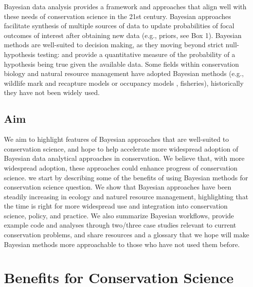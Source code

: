 \documentclass{article}
\begin{document}
\par Bayesian data analysis provides a framework and approaches that align well with these needs of conservation science in the 21st century. Bayesian approaches facilitate synthesis of multiple sources of data to update probabilities of focal outcomes of interest after obtaining new data (e.g., priors, see Box 1). Bayesian methods are well-suited to decision making, as they moving beyond strict null-hypothesis testing:
and provide a quantitative measure of the probability of a hypothesis being true given the available data. %
Some fields within conservation biology and natural resource management have adopted Bayesian methods (e.g., wildlife mark and recapture models or occupancy models \citep{}, fisheries\citep{}), historically they have not been widely used.

\subsection*{Aim} We aim to highlight features of Bayesian approaches that are well-suited to conservation science, and hope to help accelerate more widespread adoption of Bayesian data analytical approaches in conservation. We believe that, with more widespread adoption, these approaches could enhance progress of conservation science. we start by describing some of the benefits of using Bayesian methods for conservation science question. We show that Bayesian approaches have been steadily increasing in ecology and naturel resource management, highlighting that the time is right for more widespread use and integration into conservation science, policy, and practice. We also summarize Bayesian workflows, provide example code and analyses through two/three case studies relevant to current conservation problems, and share resources and a glossary that we hope will make Bayesian methods more approachable to those who have not used them before.
\section* {Benefits for Conservation Science}
\end{document}
